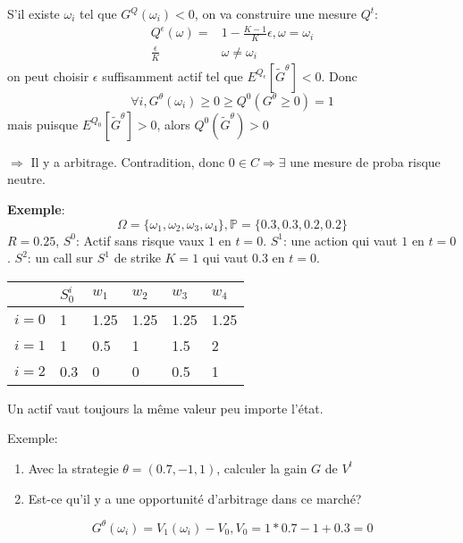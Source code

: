 \documentclass{article}
\theoremstyle{plain}
\theoremstyle{definition}
\begin{document}
S'il existe $\omega_i$ tel que $G^Q(\omega_i)<0$, on va construire une mesure $Q^t$:
\begin{equation}
\begin{split}
	Q^\epsilon(\omega)= & 1-\frac{K-1}{K}\epsilon , \omega = \omega_i \\
	\frac{\epsilon}{K} & \omega\neq \omega_i
\end{split}
\end{equation}
on peut choisir $\epsilon$ suffisamment actif tel que $E^{Q_\epsilon}[\tilde{G}^{\theta}]<0$. Donc
\begin{equation}
	\forall i, G^\theta(\omega_i)\geq 0 \geq Q^0(G^\theta\geq 0)=1
\end{equation}
mais puisque $E^{Q_0}[\tilde{G}^\theta]>0$, alors $Q^0(\tilde{G}^\theta)>0$

$\Rightarrow$ Il y a arbitrage. Contradition, donc $0\in C \Rightarrow \exists $ une mesure de proba risque neutre.

\textbf{Exemple}:
\begin{equation}
\Omega=\{\omega_1, \omega_2,\omega_3, \omega_4\}, \mathbb{P}=\{0.3, 0.3,0.2,0.2\}
\end{equation}
$R=0.25$, $S^0$: Actif sans risque vaux $1$ en $t=0$.
$S^1$: une action qui vaut $1$ en $t=0$.
$S^2$: un call sur $S^1$ de strike $K=1$ qui vaut $0.3$ en $t=0$.
\begin{center}
\begin{tabular}{l||l|l|l|l|l}
		& $S_0^i$ & $w_1$ & $w_2$ & $w_3$ & $w_4$\\ \hline \hline
	$i=0$ & 1 & 1.25 & 1.25 & 1.25 & 1.25 \\	 \hline 
	$i=1$ & 1 & 0.5 & 1 & 1.5 & 2 \\ \hline 
	$i=2$ & 0.3 & 0 & 0 & 0.5 & 1 \\ 
\end{tabular}
\end{center}

Un actif vaut toujours la m\^{e}me valeur peu importe l'\'etat.

Exemple:
\begin{enumerate}
	\item Avec la strategie $\theta=(0.7, -1, 1)$, calculer la gain $G$ de $V^t$
	\item Est-ce qu'il y a une opportunit\'e d'arbitrage dans ce march\'e?
\end{enumerate}

\begin{equation}
G^\theta(\omega_i)=V_1(\omega_i)-V_0, V_0=1*0.7-1+0.3=0
\end{equation}
\end{document}
